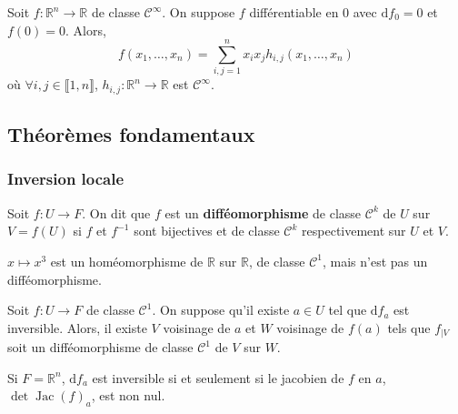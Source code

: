   \begin{application}
    Soit $f : \mathbb{R}^n \rightarrow \mathbb{R}$ de classe $\mathcal{C}^\infty$. On suppose $f$ différentiable en $0$ avec $\mathrm{d}f_0 = 0$ et $f(0) = 0$. Alors,
    \[ f(x_1, \dots, x_n) = \sum_{i,j=1}^n x_i x_j h_{i,j}(x_1, \dots, x_n) \]
    où $\forall i,j \in \llbracket 1, n \rrbracket$, $h_{i,j} : \mathbb{R}^n \rightarrow \mathbb{R}$ est $\mathcal{C}^\infty$.
  \end{application}

  \subsection{Théorèmes fondamentaux}

  \subsubsection{Inversion locale}


  \begin{definition}
    \label{key}
    Soit $f : U \rightarrow F$. On dit que $f$ est un \textbf{difféomorphisme} de classe $\mathcal{C}^k$ de $U$ sur $V = f(U)$ si $f$ et $f^{-1}$ sont bijectives et de classe $\mathcal{C}^k$ respectivement sur $U$ et $V$.
  \end{definition}

  \begin{example}
    $x \mapsto x^3$ est un homéomorphisme de $\mathbb{R}$ sur $\mathbb{R}$, de classe $\mathcal{C}^1$, mais n'est pas un difféomorphisme.
  \end{example}


  \begin{theorem}
    Soit $f : U \rightarrow F$ de classe $\mathcal{C}^1$. On suppose qu'il existe $a \in U$ tel que $\mathrm{d}f_a$ est inversible.
    \newpar
    Alors, il existe $V$ voisinage de $a$ et $W$ voisinage de $f(a)$ tels que $f_{|V}$ soit un difféomorphisme de classe $\mathcal{C}^1$ de $V$ sur $W$.
  \end{theorem}

  \begin{remark}
    Si $F = \mathbb{R}^n$, $\mathrm{d}f_a$ est inversible si et seulement si le jacobien de $f$ en $a$, $\det \operatorname{Jac}(f)_a$, est non nul.
  \end{remark}

